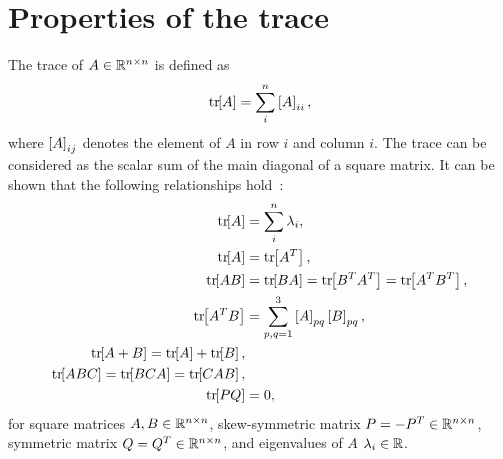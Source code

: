 
\chapter{Properties of the trace}\label{chap:trace}

The trace of \( A \in \mathbb{R}^{n \times n} \) is defined as
\begin{align}
    \mathrm{tr}\negthickspace\left[ A \right] = \sum_i^n \left[ A \right]_{ii},
\end{align}
where \( \left[ A \right]_{ij} \) denotes the element of \( A \) in row \( i \) and column \( i \).
The trace can be considered as the scalar sum of the main diagonal of a square matrix.
It can be shown that the following relationships hold~\cite{petersen2008,strang2008}:
\begin{align}
    \tr{A} &= \sum_i^n \lambda_i, \label{eq:treig}\\
    \tr{A} &= \tr{A^T}, \label{eq:trAT} \\
    \tr{A B} &= \tr{B A} = \tr{B^T A^T} = \tr{A^T B^T}, \label{eq:trAB} \\
    \tr{A^T B } &= \sum_{p, q=1}^3 \bracket{A}_{pq} \bracket{B}_{pq}, \label{eq:trATB} \\
    \tr{A+B} = \tr{A} + \tr{B}, \label{eq:trApB} \\
    \tr{ABC} = \tr{BCA} = \tr{CAB}, \label{eq:trABC}\\
    \tr{PQ} &= 0, \label{eq:trPQ}
\end{align}
for square matrices \( A, B \in \mathbb{R}^{n \times n} \), skew-symmetric matrix \( P = -P^T \in \mathbb{R}^{n\times n} \), symmetric matrix \( Q = Q^T \in \mathbb{R}^{n \times n} \), and eigenvalues of \( A \) \( \lambda_i \in \mathbb{R} \).

